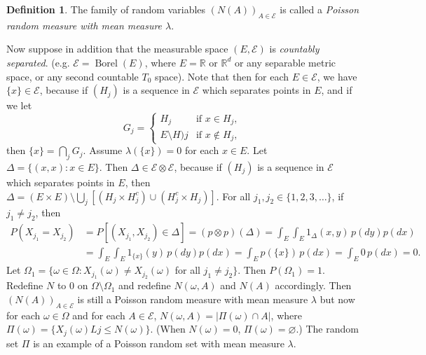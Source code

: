 \documentclass{article}
\DeclareMathOperator{\Borel}{Borel}
\newcommand{\R}{\mathbb{R}}
\theoremstyle{definition}
\newtheorem*{definition}{Definition}
\begin{document}
\begin{definition}
The family of random variables $(N(A))_{A \in \mathscr{E}}$ is called a \emph{Poisson random measure with mean measure $\lambda$}.
\end{definition}

Now suppose in addition that the measurable space $(E, \mathscr{E})$ is \emph{countably separated}. (e.g. $\mathscr{E} = \Borel(E)$, where $E = \R$ or $\R^d$ or any separable metric space, or any second countable $T_0$ space). Note that then for each $E \in \mathscr{E}$, we have $\{x\} \in \mathscr{E}$, because if $(H_j)$ is a sequence in $\mathscr{E}$ which separates points in $E$, and if we let \[
    G_j = \begin{cases}
        H_j &\text{if } x \in H_j, \\
        E \setminus H)j &\text{if } x \notin H_j,
    \end{cases}
\]
then $\{x\} = \bigcap_j G_j$. Assume $\lambda(\{x\}) = 0$ for each $x \in E$. Let $\Delta = \{(x, x) : x \in E\}$. Then $\Delta \in \mathscr{E} \otimes \mathscr{E}$, because if $(H_j)$ is a sequence in $\mathscr{E}$ which separates points in $E$, then $\Delta = (E \times E) \setminus \bigcup_j [(H_j \times H_j^c) \cup (H_j^c \times H_j)]$. For all $j_1, j_2 \in \{1, 2, 3, \dots\}$, if $j_1 \neq j_2$, then
\begin{align*}
    P(X_{j_1} = X_{j_2}) &= P[(X_{j_1}, X_{j_2}) \in \Delta] = (p \otimes p)(\Delta) = \int_E \int_E 1_\Delta(x,y)\,p(dy) p(dx) \\
    &= \int_E \int_E 1_{\{x\}}(y)\,p(dy) p(dx) = \int_E p(\{x\}) \,p(dx) = \int_E 0\,p(dx) = 0.
\end{align*}
Let $\Omega_1 = \{\omega \in \Omega : X_{j_1}(\omega) \neq X_{j_2}(\omega)$ for all $j_1 \neq j_2\}$. Then $P(\Omega_1) = 1$. Redefine $N$ to $0$ on $\Omega \setminus \Omega_1$ and redefine $N(\omega, A)$ and $N(A)$ accordingly. Then $(N(A))_{A \in \mathscr{E}}$ is still a Poisson random measure with mean measure $\lambda$ but now for each $\omega \in \Omega$ and for each $A \in \mathscr{E}$, $N(\omega, A) = |\Pi(\omega) \cap A|$, where $\Pi(\omega) = \{X_j(\omega) L j \leq N(\omega)\}$. (When $N(\omega) = 0$, $\Pi(\omega) = \varnothing$.) The random set $\Pi$ is an example of a Poisson random set with mean measure $\lambda$.
\end{document}
